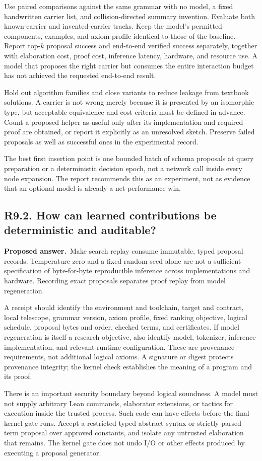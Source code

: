 \documentclass[11pt,a4paper]{article}
\newcommand{\question}[2]{\subsection{#1. #2}\label{q:#1}}
\newcommand{\answer}{\textbf{Proposed answer.}\ }
\theoremstyle{remark}
\begin{document}
Use paired comparisons against the same grammar with no model, a fixed
handwritten carrier list, and collision-directed summary invention. Evaluate
both known-carrier and invented-carrier tracks. Keep the model's permitted
components, examples, and axiom profile identical to those of the baseline.
Report top-$k$ proposal success and end-to-end verified success separately,
together with elaboration cost, proof cost, inference latency, hardware, and
resource use. A model that proposes the right carrier but consumes the
entire interaction budget has not achieved the requested end-to-end result.

Hold out algorithm families and close variants to reduce leakage from
textbook solutions. A carrier is not wrong merely because it is presented
by an isomorphic type, but acceptable equivalence and cost criteria must be
defined in advance. Count a proposed helper as useful only after its
implementation and required proof are obtained, or report it explicitly as
an unresolved sketch. Preserve failed proposals as well as successful ones
in the experimental record.

The best first insertion point is one bounded batch of schema proposals at
query preparation or a deterministic decision epoch, not a network call
inside every node expansion. The report recommends this as an experiment,
not as evidence that an optional model is already a net performance win.

\question{R9.2}{How can learned contributions be deterministic and auditable?}

\answer Make search replay consume immutable, typed proposal records.
Temperature zero and a fixed random seed alone are not a sufficient
specification of byte-for-byte reproducible inference across implementations
and hardware. Recording exact proposals separates proof replay from model
regeneration.

A receipt should identify the environment and toolchain, target and contract,
local telescope, grammar version, axiom profile, fixed ranking objective,
logical schedule, proposal bytes and order, checked terms, and certificates.
If model regeneration is itself a research objective, also identify model,
tokenizer, inference implementation, and relevant runtime configuration.
These are provenance requirements, not additional logical axioms. A signature
or digest protects provenance integrity; the kernel check establishes the
meaning of a program and its proof.

There is an important security boundary beyond logical soundness. A model
must not supply arbitrary Lean commands, elaborator extensions, or tactics
for execution inside the trusted process. Such code can have effects before
the final kernel gate runs. Accept a restricted typed abstract syntax or
strictly parsed term proposal over approved constants, and isolate any
untrusted elaboration that remains. The kernel gate does not undo I/O or
other effects produced by executing a proposal generator.
\end{document}
